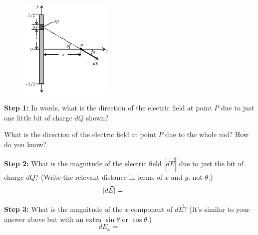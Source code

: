 \begin{figure}
\vspace{-.65in}
   \includegraphics[width=0.4\textwidth]{electric_field_near_a_charged_rod/fig2.eps}
\end{figure}


\par
\vspace{0.5cm}
\par
\textbf{Step 1:} \newline
In words, what is the direction of the electric field at point $P$ due to just one little bit of charge $dQ$ shown?

\vspace{.6in}

What is the direction of the electric field at point $P$ due to the whole rod?  How do you know?

\vspace{.6in}

\textbf{Step 2:} \newline
What is the magnitude of the electric field $|d\vec{E}|$  due to just the bit of charge $dQ$?  (Write the relevant distance in terms of $x$ and $y$, not $\theta$.)
\[
|d\vec{E}|=\hspace{0.7in}
\]
\vspace{.3in}

\textbf{Step 3:} \newline
What is the magnitude of the $x$-component of   $d\vec{E}$?  (It's similar to your answer above but with an extra $\sin \theta$ or $\cos \theta$.) 
\[
d{E}_x=\hspace{1in}
\]
\vspace{.3in}

